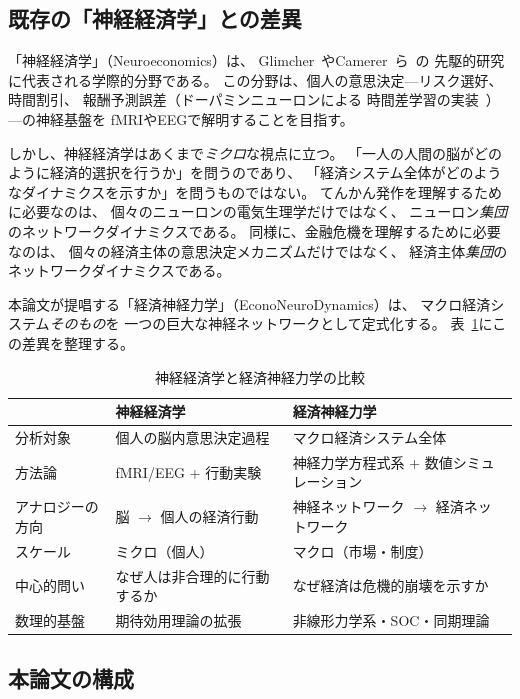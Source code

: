 \documentclass[12pt,twocolumn]{ltjsarticle}
\begin{document}
\subsection{既存の「神経経済学」との差異}

「神経経済学」（Neuroeconomics）は、
Glimcher~\cite{Glimcher2011}やCamerer~ら~\cite{Camerer2005}の
先駆的研究に代表される学際的分野である。
この分野は、個人の意思決定---リスク選好、時間割引、
報酬予測誤差（ドーパミンニューロンによる
時間差学習の実装~\cite{Schultz1997}）---の神経基盤を
fMRIやEEGで解明することを目指す。

しかし、神経経済学はあくまで\emph{ミクロ}な視点に立つ。
「一人の人間の脳がどのように経済的選択を行うか」を問うのであり、
「経済システム全体がどのようなダイナミクスを示すか」を問うものではない。
てんかん発作を理解するために必要なのは、
個々のニューロンの電気生理学だけではなく、
ニューロン\emph{集団}のネットワークダイナミクスである。
同様に、金融危機を理解するために必要なのは、
個々の経済主体の意思決定メカニズムだけではなく、
経済主体\emph{集団}のネットワークダイナミクスである。

本論文が提唱する「経済神経力学」（EconoNeuroDynamics）は、
マクロ経済システム\emph{そのもの}を
一つの巨大な神経ネットワークとして定式化する。
表~\ref{tab:comparison}にこの差異を整理する。

\begin{table}[t]
\centering
\caption{神経経済学と経済神経力学の比較}
\label{tab:comparison}
\begin{tabular}{lll}
\toprule
& \textbf{神経経済学} & \textbf{経済神経力学} \\
\midrule
分析対象 & 個人の脳内意思決定過程 & マクロ経済システム全体 \\
方法論 & fMRI/EEG + 行動実験 & 神経力学方程式系 + 数値シミュレーション \\
アナロジーの方向 & 脳 $\to$ 個人の経済行動 & 神経ネットワーク $\to$ 経済ネットワーク \\
スケール & ミクロ（個人） & マクロ（市場・制度） \\
中心的問い & なぜ人は非合理的に行動するか & なぜ経済は危機的崩壊を示すか \\
数理的基盤 & 期待効用理論の拡張 & 非線形力学系・SOC・同期理論 \\
\bottomrule
\end{tabular}
\end{table}

\subsection{本論文の構成}
\end{document}
